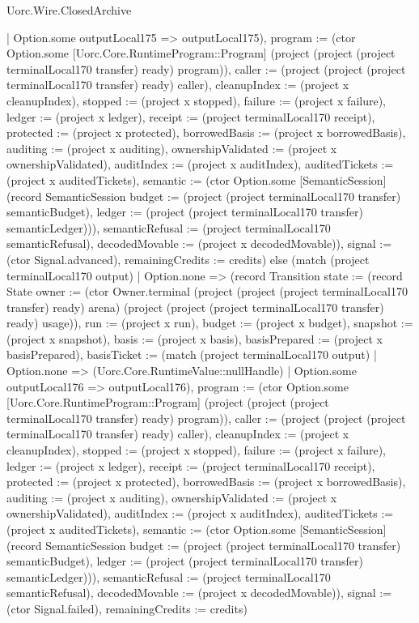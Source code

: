 \begin{lexlean}{Uorc.Wire.ClosedArchive}
\begin{semanticmodule}
{{{            | Option.some outputLocal175 => outputLocal175), program := (ctor Option.some [Uorc.Core.RuntimeProgram::Program] (project (project (project terminalLocal170 transfer) ready) program)), caller := (project (project (project terminalLocal170 transfer) ready) caller), cleanupIndex := (project x cleanupIndex), stopped := (project x stopped), failure := (project x failure), ledger := (project x ledger), receipt := (project terminalLocal170 receipt), protected := (project x protected), borrowedBasis := (project x borrowedBasis), auditing := (project x auditing), ownershipValidated := (project x ownershipValidated), auditIndex := (project x auditIndex), auditedTickets := (project x auditedTickets), semantic := (ctor Option.some [SemanticSession] (record SemanticSession {budget := (project (project terminalLocal170 transfer) semanticBudget), ledger := (project (project terminalLocal170 transfer) semanticLedger)})), semanticRefusal := (project terminalLocal170 semanticRefusal), decodedMovable := (project x decodedMovable)}), signal := (ctor Signal.advanced), remainingCredits := credits}) else (match (project terminalLocal170 output)
            | Option.none => (record Transition {state := (record State {owner := (ctor Owner.terminal (project (project (project terminalLocal170 transfer) ready) arena) (project (project (project terminalLocal170 transfer) ready) usage)), run := (project x run), budget := (project x budget), snapshot := (project x snapshot), basis := (project x basis), basisPrepared := (project x basisPrepared), basisTicket := (match (project terminalLocal170 output)
              | Option.none => (Uorc.Core.RuntimeValue::nullHandle)
              | Option.some outputLocal176 => outputLocal176), program := (ctor Option.some [Uorc.Core.RuntimeProgram::Program] (project (project (project terminalLocal170 transfer) ready) program)), caller := (project (project (project terminalLocal170 transfer) ready) caller), cleanupIndex := (project x cleanupIndex), stopped := (project x stopped), failure := (project x failure), ledger := (project x ledger), receipt := (project terminalLocal170 receipt), protected := (project x protected), borrowedBasis := (project x borrowedBasis), auditing := (project x auditing), ownershipValidated := (project x ownershipValidated), auditIndex := (project x auditIndex), auditedTickets := (project x auditedTickets), semantic := (ctor Option.some [SemanticSession] (record SemanticSession {budget := (project (project terminalLocal170 transfer) semanticBudget), ledger := (project (project terminalLocal170 transfer) semanticLedger)})), semanticRefusal := (project terminalLocal170 semanticRefusal), decodedMovable := (project x decodedMovable)}), signal := (ctor Signal.failed), remainingCredits := credits})
}
\end{semanticmodule}
\end{lexlean}
